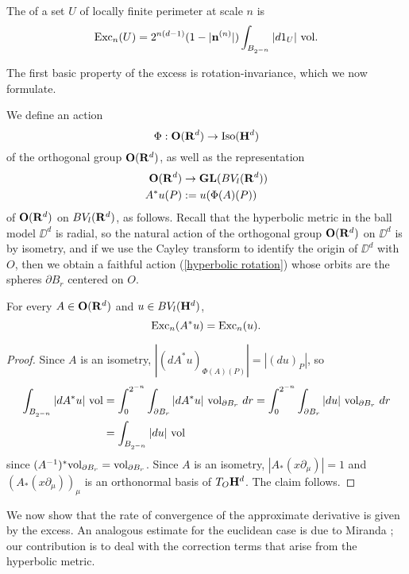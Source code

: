 \begin{definition}
The  of a set $U$ of locally finite perimeter at scale $n$ is
$$\operatorname{Exc}_n(U) = 2^{n(d - 1)} (1 - |\mathbf n^{(n)}|) \int_{B_{2^{-n}}} |d1_U| ~\mathrm{vol}.$$
\end{definition}

The first basic property of the excess is rotation-invariance, which we now formulate.

\begin{notation}
We define an action
\begin{equation}\label{hyperbolic rotation}
    \Phi: \mathbf{O}(\mathbf{R}^d) \to \operatorname{Iso}(\mathbf H^d)
\end{equation}
of the orthogonal group $\mathbf{O}(\mathbf{R}^d)$, as well as the representation
\begin{align*}
\mathbf{O}(\mathbf{R}^d) &\to \mathbf{GL}(BV_l(\mathbf{R}^d))\\
A^* u(P) &:= u(\Phi(A)(P))
\end{align*}
of $\mathbf{O}(\mathbf{R}^d)$ on $BV_l(\mathbf{R}^d)$, as follows.
Recall that the hyperbolic metric in the ball model $\DD^d$ is radial, so the natural action of the orthogonal group $\mathbf{O}(\mathbf{R}^d)$ on $\DD^d$ is by isometry, and if we use the Cayley transform to identify the origin of $\DD^d$ with $O$, then we obtain a faithful action (\ref{hyperbolic rotation}) whose orbits are the spheres $\partial B_r$ centered on $O$.
\end{notation}

\begin{lemma}\label{excess rotation invariant}
For every $A \in \mathbf{O}(\mathbf{R}^d)$ and $u \in BV_l(\mathbf H^d)$,
$$\operatorname{Exc}_n(A^* u) = \operatorname{Exc}_n(u).$$
\end{lemma}
\begin{proof}
Since $A$ is an isometry, $|(d A^* u)_{\Phi(A)(P)}| = |(du)_P|$, so
\begin{align*}
\int_{B_{2^{-n}}} |dA^*u| ~\mathrm{vol} &= \int_0^{2^{-n}} \int_{\partial B_r} |dA^* u| ~\mathrm{vol}_{\partial B_r} ~dr = \int_0^{2^{-n}} \int_{\partial B_r} |du| ~\mathrm{vol}_{\partial B_r} ~dr\\
&= \int_{B_{2^{-n}}} |du| ~\mathrm{vol}
\end{align*}
since $(A^{-1})^* \mathrm{vol}_{\partial B_r} = \mathrm{vol}_{\partial B_r}$.
Since $A$ is an isometry, $|A_* (x \partial_\mu)| = 1$ and $(A_*(x \partial_\mu))_\mu$ is an orthonormal basis of $T_O \mathbf H^d$.
The claim follows.
\end{proof}

We now show that the rate of convergence of the approximate derivative is given by the excess.
An analogous estimate for the euclidean case is due to Miranda \cite[pg661]{Miranda66}; our contribution is to deal with the correction terms that arise from the hyperbolic metric.

